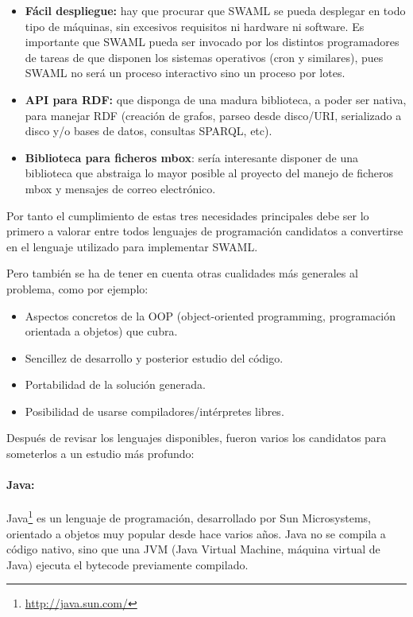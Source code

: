 \begin{itemize}
  \item \textbf{Fácil despliegue:} hay que procurar que SWAML se pueda desplegar 
	en todo tipo de máquinas, sin excesivos requisitos ni hardware ni software.
	Es importante que SWAML pueda ser invocado por los distintos programadores
	de tareas de que disponen los sistemas operativos (cron y similares), pues
	SWAML no será un proceso interactivo sino un proceso por lotes.
  \item \textbf{API para RDF:} que disponga de una madura biblioteca, a poder ser 
	nativa, para manejar RDF (creación de grafos, parseo desde disco/URI, 
	serializado a disco y/o bases de datos, consultas SPARQL, etc).
  \item \textbf{Biblioteca para ficheros mbox}: sería interesante disponer de una 
	biblioteca que abstraiga lo mayor posible al proyecto del manejo de ficheros
	mbox\cite{Hall2005} y mensajes de correo electrónico\cite{Resnick2001}.
\end{itemize}

Por tanto el cumplimiento de estas tres necesidades principales debe ser lo 
primero a valorar entre todos lenguajes de programación candidatos a convertirse 
en el lenguaje utilizado para implementar SWAML. 

Pero también se ha de tener en cuenta otras cualidades más generales al problema,
como por ejemplo:

\begin{itemize}
  \item Aspectos concretos de la OOP (object-oriented programming, programación 
	orientada a objetos) que cubra.
  \item Sencillez de desarrollo y posterior estudio del código.
  \item Portabilidad de la solución generada.
  \item Posibilidad de usarse compiladores/intérpretes libres.
\end{itemize}

Después de revisar los lenguajes disponibles, fueron varios los candidatos para
someterlos a un estudio más profundo:

\paragraph{Java:}Java\footnote{\url{http://java.sun.com/}} es un lenguaje de 
programación, desarrollado por Sun Microsystems, orientado a objetos muy popular 
desde hace varios años. Java no se compila a código nativo, sino que una JVM 
(Java Virtual Machine, máquina virtual de Java) ejecuta el bytecode previamente 
compilado.

